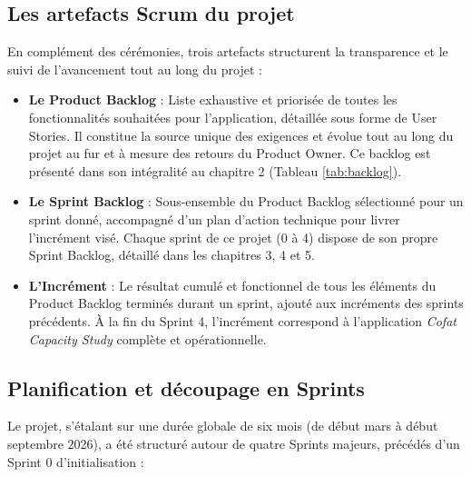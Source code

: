 \subsection{Les artefacts Scrum du projet}
En complément des cérémonies, trois artefacts structurent la transparence et le suivi de l'avancement tout au long du projet :
\begin{itemize}
    \item \textbf{Le Product Backlog} : Liste exhaustive et priorisée de toutes les fonctionnalités souhaitées pour l'application, détaillée sous forme de User Stories. Il constitue la source unique des exigences et évolue tout au long du projet au fur et à mesure des retours du Product Owner. Ce backlog est présenté dans son intégralité au chapitre 2 (Tableau \ref{tab:backlog}).
    \item \textbf{Le Sprint Backlog} : Sous-ensemble du Product Backlog sélectionné pour un sprint donné, accompagné d'un plan d'action technique pour livrer l'incrément visé. Chaque sprint de ce projet (0 à 4) dispose de son propre Sprint Backlog, détaillé dans les chapitres 3, 4 et 5.
    \item \textbf{L'Incrément} : Le résultat cumulé et fonctionnel de tous les éléments du Product Backlog terminés durant un sprint, ajouté aux incréments des sprints précédents. À la fin du Sprint 4, l'incrément correspond à l'application \textit{Cofat Capacity Study} complète et opérationnelle.
\end{itemize}

\subsection{Planification et découpage en Sprints}
Le projet, s'étalant sur une durée globale de six mois (de début mars à début septembre 2026), a été structuré autour de quatre Sprints majeurs, précédés d'un Sprint 0 d'initialisation :

